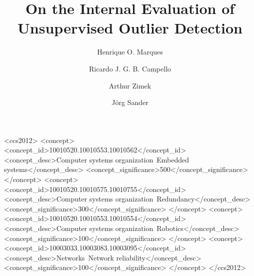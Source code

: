 \documentclass[acmlarge]{acmart}
\begin{document}
\title{On the Internal Evaluation of Unsupervised Outlier Detection} 

\author{Henrique O. Marques}
\author{Ricardo J. G. B. Campello}
\author{Arthur Zimek} 
\author{J{\"o}rg Sander}



\begin{abstract}

\end{abstract}


%
%
\begin{CCSXML}
<ccs2012>
 <concept>
  <concept_id>10010520.10010553.10010562</concept_id>
  <concept_desc>Computer systems organization~Embedded systems</concept_desc>
  <concept_significance>500</concept_significance>
 </concept>
 <concept>
  <concept_id>10010520.10010575.10010755</concept_id>
  <concept_desc>Computer systems organization~Redundancy</concept_desc>
  <concept_significance>300</concept_significance>
 </concept>
 <concept>
  <concept_id>10010520.10010553.10010554</concept_id>
  <concept_desc>Computer systems organization~Robotics</concept_desc>
  <concept_significance>100</concept_significance>
 </concept>
 <concept>
  <concept_id>10003033.10003083.10003095</concept_id>
  <concept_desc>Networks~Network reliability</concept_desc>
  <concept_significance>100</concept_significance>
 </concept>
</ccs2012>  
\end{CCSXML}

\end{document}
